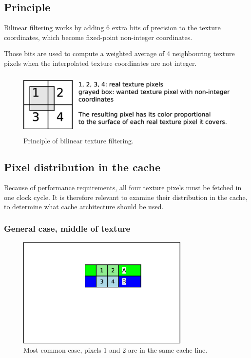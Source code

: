\documentclass[a4paper,11pt]{article}
\begin{document}
\subsection{Principle}
Bilinear filtering works by adding 6 extra bits of precision to the texture coordinates, which become fixed-point non-integer coordinates.

Those bits are used to compute a weighted average of 4 neighbouring texture pixels when the interpolated texture coordinates are not integer.

\begin{figure}[H]
\centering
\includegraphics[height=32mm]{bilinear.eps}
\caption{Principle of bilinear texture filtering.}\label{fig:bilinear}
\end{figure}

\subsection{Pixel distribution in the cache}
Because of performance requirements, all four texture pixels must be fetched in one clock cycle. It is therefore relevant to examine their distribution in the cache, to determine what cache architecture should be used.

\subsubsection{General case, middle of texture}
\begin{figure}[H]
\centering
\includegraphics[height=55mm]{dist_common.eps}
\caption{Most common case, pixels 1 and 2 are in the same cache line.}\label{fig:case1}
\end{figure}
\end{document}
